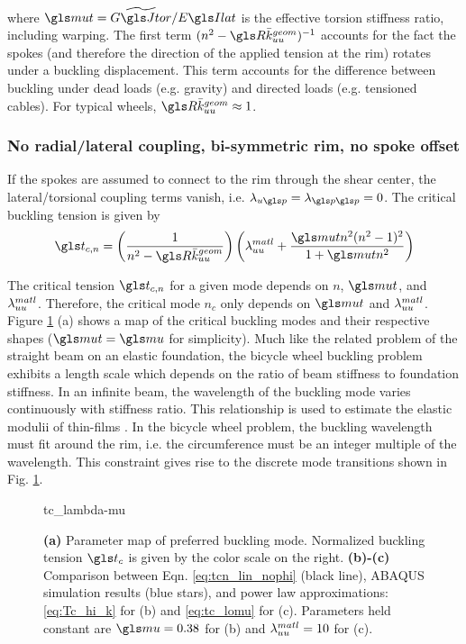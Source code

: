 \documentclass[\rootdir/thesis.tex]{subfiles}
\begin{document}
where $\mt=\widetilde{\GJ}/\EIl$ is the effective torsion stiffness ratio, including warping. The first term $(n^2 - \R\geom{\kuu})^{-1}$ accounts for the fact the spokes (and therefore the direction of the applied tension at the rim) rotates under a buckling displacement. This term accounts for the difference between buckling under dead loads (e.g. gravity) and directed loads (e.g. tensioned cables). For typical wheels, $\R\geom{\kuu} \approx 1$.

\subsubsection*{No radial/lateral coupling, bi-symmetric rim, no spoke offset}
If the spokes are assumed to connect to the rim through the shear center, the lateral/torsional coupling terms vanish, i.e. $\lr_{u\p}=\lr_{\p\p}=0$. The critical buckling tension is given by
\begin{equation}
\label{eq:tcn_lin_nophi}
\ts_{c,n} = \left(\frac{1}{n^2 - \R\geom{\kuu}}\right)
\left(\matl{\lr_{uu}}
      +\frac{\mt n^2(n^2-1)^2}
        {1 + \mt n^2}\right)
\end{equation}

The critical tension $\ts_{c,n}$ for a given mode depends on $n$, $\mt$, and $\lambda_{uu}^{matl}$. Therefore, the critical mode $n_c$ only depends on $\mt$ and $\lambda_{uu}^{matl}$. Figure \ref{fig:tc_lambda_mu} (a) shows a map of the critical buckling modes and their respective shapes ($\mt=\m$ for simplicity). Much like the related problem of the straight beam on an elastic foundation, the bicycle wheel buckling problem exhibits a length scale which depends on the ratio of beam stiffness to foundation stiffness. In an infinite beam, the wavelength of the buckling mode varies continuously with stiffness ratio. This relationship is used to estimate the elastic modulii of thin-films \cite{Chung2011}. In the bicycle wheel problem, the buckling wavelength must fit around the rim, i.e. the circumference must be an integer multiple of the wavelength. This constraint gives rise to the discrete mode transitions shown in Fig. \ref{fig:tc_lambda_mu}.

\begin{figure}
\centering
{tc_lambda-mu}
\caption{\textbf{(a)} Parameter map of preferred buckling mode. Normalized buckling tension $\ts_c$ is given by the color scale on the right. \textbf{(b)-(c)} Comparison between Eqn. \eqref{eq:tcn_lin_nophi} (black line), ABAQUS simulation results (blue stars), and power law approximations: \eqref{eq:Tc_hi_k} for (b) and \eqref{eq:tc_lomu} for (c). Parameters held constant are $\m=0.38$ for (b) and $\lambda_{uu}^{matl}=10$ for (c).}
\label{fig:tc_lambda_mu}
\end{figure}
\end{document}
